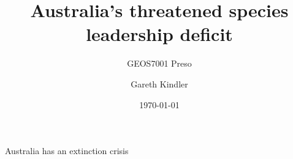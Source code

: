 \documentclass{beamer}
\title{Australia's threatened species leadership deficit}
\subtitle{GEOS7001 Preso}
\author{Gareth Kindler}
\date{\today}
\begin{document}
\frame{\titlepage}

{
\begin{frame}{\color{white}Australia has an extinction crisis} %
\end{frame}}
\end{document}

